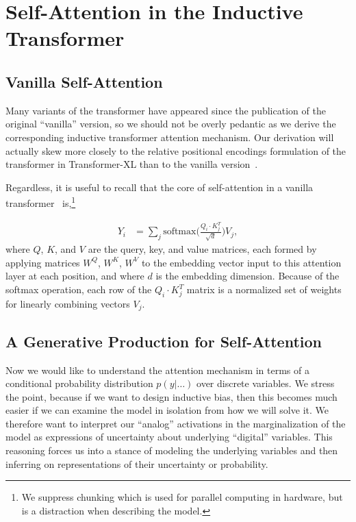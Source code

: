 \documentclass{article}
\begin{document}
\section{Self-Attention in the Inductive Transformer}

\subsection{Vanilla Self-Attention}\label{appendix:vanilla-self-attention}

Many variants of the transformer have appeared since the publication of the original ``vanilla'' version, so we should not be overly pedantic as we derive the corresponding inductive transformer attention mechanism.  Our derivation will actually skew more closely to the relative positional encodings formulation of the transformer in Transformer-XL than to the vanilla version~\citep{dai2019transformerxl}. 

Regardless, it is useful to recall that the core of self-attention in a vanilla transformer~\citep{vaswani2017attention} is,\footnote{We suppress chunking which is used for parallel computing in hardware, but is a distraction when describing the model.}  

\begin{align} \label{eq:vanilla-self-attention}
    Y_i &= \sum_j\text{softmax} \Bigg(\frac{Q_i \cdot K_j^T}{\sqrt{d}} \Bigg) V_j,
\end{align}
where $Q$, $K$, and $V$ are the query, key, and value matrices, each formed by applying matrices $W^Q$, $W^K$, $W^V$ to the embedding vector input to this attention layer at each position, and where $d$ is the embedding dimension.  Because of the softmax operation, each row of the $Q_i \cdot K_j^T$ matrix is a normalized set of weights for linearly combining vectors $V_j$.  


\subsection{A Generative Production for Self-Attention}

Now we would like to understand the attention mechanism in terms of a conditional probability distribution $p(y| \ldots)$ over discrete variables.  We stress the point, because if we want to design inductive bias, then this becomes much easier if we can examine the model in isolation from how we will solve it. We therefore want to interpret our ``analog'' activations in the marginalization of the model as expressions of uncertainty about underlying ``digital'' variables.  This reasoning forces us into a stance of modeling the underlying variables and then inferring on representations of their uncertainty or probability.  
\end{document}
